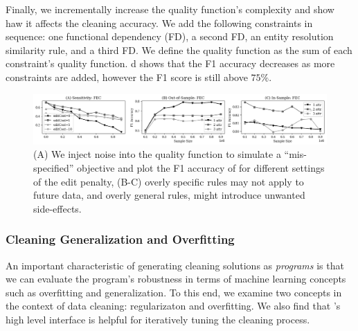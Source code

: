 
 Finally, we incrementally increase the quality function's complexity and show haw it affects the cleaning accuracy.  We add the following constraints in sequence: one functional dependency (FD), a second FD, an entity resolution similarity rule, and a third FD.  We define the quality function as the sum of each constraint's quality function.   d shows that the F1 accuracy decreases as more constraints are added, however the F1 score is still above $75\%$.  


 \begin{figure}[ht]
\centering
 \includegraphics[width=\textwidth]{exp/exp5.png}
 \caption{ (A) We inject noise into the quality function to simulate a ``mis-specified'' objective and plot the F1 accuracy of \sys for different settings of the edit penalty, (B-C) overly specific rules may not apply to future data, and overly general rules, might introduce unwanted side-effects. 
 \label{fig:sensitivity}}
\end{figure}

\subsubsection{Cleaning Generalization and Overfitting}
An important characteristic of generating cleaning solutions as {\it programs} is that we can evaluate the program's robustness in terms of machine learning concepts such as overfitting and generalization.    To this end, we examine two concepts in the context of data cleaning: regularizaton and overfitting.  We also find that \sys's high level interface is helpful for iteratively tuning the cleaning process.

